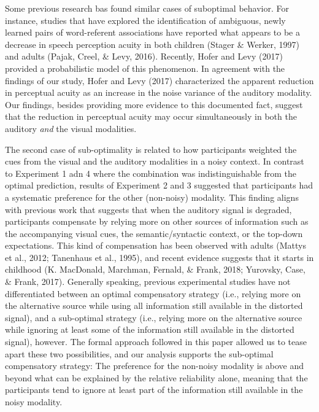 \documentclass[english,,man,floatsintext]{apa6}
\theoremstyle{definition}
\theoremstyle{definition}
\theoremstyle{definition}
\theoremstyle{remark}
\begin{document}
Some previous research bas found similar cases of suboptimal behavior.
For instance, studies that have explored the identification of
ambiguous, newly learned pairs of word-referent associations have
reported what appears to be a decrease in speech perception acuity in
both children (Stager \& Werker, 1997) and adults (Pajak, Creel, \&
Levy, 2016). Recently, Hofer and Levy (2017) provided a probabilistic
model of this phenomenon. In agreement with the findings of our study,
Hofer and Levy (2017) characterized the apparent reduction in perceptual
acuity as an increase in the noise variance of the auditory modality.
Our findings, besides providing more evidence to this documented fact,
suggest that the reduction in perceptual acuity may occur simultaneously
in both the auditory \emph{and} the visual modalities.

The second case of sub-optimality is related to how participants
weighted the cues from the visual and the auditory modalities in a noisy
context. In contrast to Experiment 1 adn 4 where the combination was
indistinguishable from the optimal prediction, results of Experiment 2
and 3 suggested that participants had a systematic preference for the
other (non-noisy) modality. This finding aligns with previous work that
suggests that when the auditory signal is degraded, participants
compensate by relying more on other sources of information such as the
accompanying visual cues, the semantic/syntactic context, or the
top-down expectations. This kind of compensation has been observed with
adults (Mattys et al., 2012; Tanenhaus et al., 1995), and recent
evidence suggests that it starts in childhood (K. MacDonald, Marchman,
Fernald, \& Frank, 2018; Yurovsky, Case, \& Frank, 2017). Generally
speaking, previous experimental studies have not differentiated between
an optimal compensatory strategy (i.e., relying more on the alternative
source while using all information still available in the distorted
signal), and a sub-optimal strategy (i.e., relying more on the
alternative source while ignoring at least some of the information still
available in the distorted signal), however. The formal approach
followed in this paper allowed us to tease apart these two
possibilities, and our analysis supports the sub-optimal compensatory
strategy: The preference for the non-noisy modality is above and beyond
what can be explained by the relative reliability alone, meaning that
the participants tend to ignore at least part of the information still
available in the noisy modality.
\end{document}
